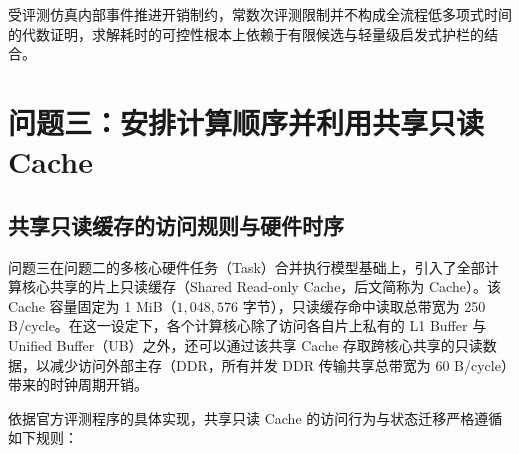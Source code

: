 \documentclass[anonymous,notoc]{gmcm2026}
\begin{document}
受评测仿真内部事件推进开销制约，常数次评测限制并不构成全流程低多项式时间的代数证明，求解耗时的可控性根本上依赖于有限候选与轻量级启发式护栏的结合。


\section{问题三：安排计算顺序并利用共享只读Cache}

\subsection{共享只读缓存的访问规则与硬件时序}

问题三在问题二的多核心硬件任务（Task）合并执行模型基础上，引入了全部计算核心共享的片上只读缓存（Shared Read-only Cache，后文简称为 Cache）。该 Cache 容量固定为 1 MiB（\(1{,}048{,}576\) 字节），只读缓存命中读取总带宽为 250 B/cycle。在这一设定下，各个计算核心除了访问各自片上私有的 L1 Buffer 与 Unified Buffer（UB）之外，还可以通过该共享 Cache 存取跨核心共享的只读数据，以减少访问外部主存（DDR，所有并发 DDR 传输共享总带宽为 60 B/cycle）带来的时钟周期开销。

依据官方评测程序的具体实现，共享只读 Cache 的访问行为与状态迁移严格遵循如下规则：
\end{document}
